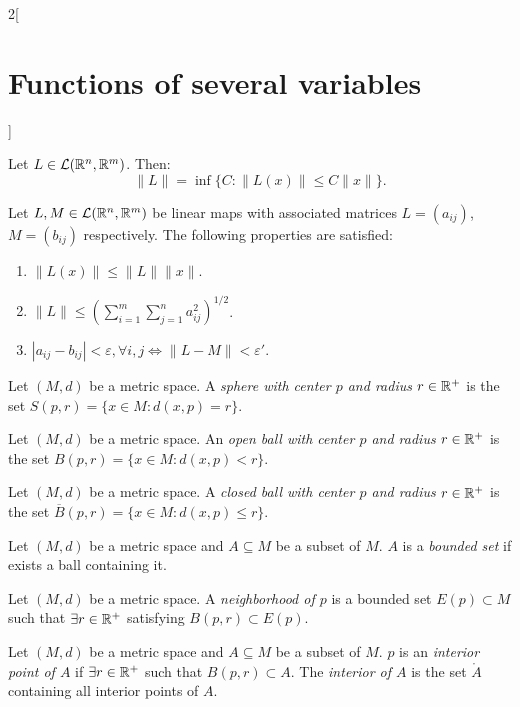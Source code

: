 \documentclass[../../../main.tex]{subfiles}
\begin{document}
\begin{multicols}{2}[\section{Functions of several variables}]
\begin{prop}
        Let $L\in\mathcal{L}(\mathbb{R}^n,\mathbb{R}^m)$. Then: $$\|L\|=\inf\{C:\|L(x)\|\leq C\|x\|\}.$$
    \end{prop}
    \begin{corollary}
        Let $L,M\in\mathcal{L}(\mathbb{R}^n,\mathbb{R}^m)$ be linear maps with associated matrices $L=(a_{ij})$, $M=(b_{ij})$ respectively. The following properties are satisfied:
        \begin{enumerate}
            \item $\|L(x)\|\leq\|L\|\|x\|$.
            \item $\displaystyle\|L\|\leq\left(\sum_{i=1}^m\sum_{j=1}^na_{ij}^2\right)^{1/2}$.
            \item $|a_{ij}-b_{ij}|<\varepsilon,\forall i,j\iff\|L-M\|<\varepsilon'$.
        \end{enumerate}
    \end{corollary}
    \begin{definition}
        Let $(M,d)$ be a metric space. A \textit{sphere with center $p$ and radius $r\in\mathbb{R}^+$} is the set $S(p,r)=\{x\in M:d(x,p)=r\}$.
    \end{definition}
    \begin{definition}
        Let $(M,d)$ be a metric space. An \textit{open ball with center $p$ and radius $r\in\mathbb{R}^+$} is the set $B(p,r)=\{x\in M:d(x,p)<r\}$.
    \end{definition}
    \begin{definition}
        Let $(M,d)$ be a metric space. A \textit{closed ball with center $p$ and radius $r\in\mathbb{R}^+$} is the set $\overline{B}(p,r)=\{x\in M:d(x,p)\leq r\}$.
    \end{definition}
    \begin{definition}
        Let $(M,d)$ be a metric space and $A\subseteq M$ be a subset of $M$. $A$ is a \textit{bounded set} if exists a ball containing it.
    \end{definition}
    \begin{definition}
        Let $(M,d)$ be a metric space. A \textit{neighborhood of $p$} is a bounded set $E(p)\subset M$ such that $\exists r\in\mathbb{R}^+$ satisfying $B(p,r)\subset E(p)$.
    \end{definition}
    \begin{definition}
        Let $(M,d)$ be a metric space and $A\subseteq M$ be a subset of $M$. $p$ is an \textit{interior point of $A$} if $\exists r\in\mathbb{R}^+$ such that $B(p,r)\subset A$. The \textit{interior of $A$} is the set $\mathring A$ containing all interior points of $A$.
    \end{definition}

\end{multicols}
\end{document}
